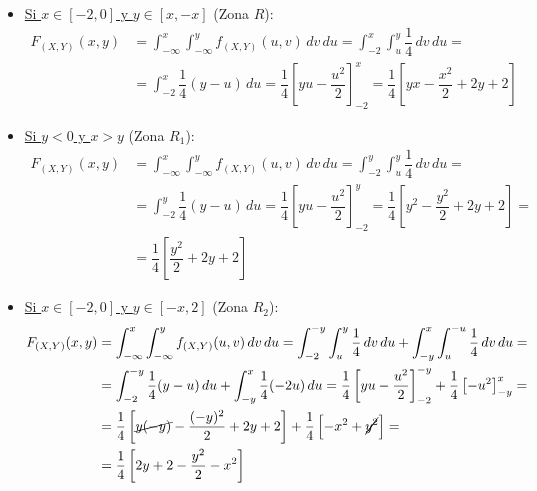 \documentclass[12pt]{article}
\begin{document}
\begin{ejercicio}
\begin{enumerate}
\begin{itemize}
                \item \ul{Si $x\in [-2, 0]$ y $y\in [x, -x]$} (Zona $R$):
                \begin{align*}
                    F_{(X,Y)}(x, y) &= \int_{-\infty}^x \int_{-\infty}^y f_{(X,Y)}(u, v) \, dv \, du = \int_{-2}^x \int_{u}^{y} \dfrac{1}{4} \, dv \, du
                    =\\&= \int_{-2}^x \dfrac{1}{4}(y-u) \, du = \dfrac{1}{4}\left[yu - \dfrac{u^2}{2}\right]_{-2}^x = \dfrac{1}{4}\left[yx - \dfrac{x^2}{2} + 2y+2\right]
                \end{align*}

                \item \ul{Si $y<0$ y $x > y$} (Zona $R_1$):
                \begin{align*}
                    F_{(X,Y)}(x, y) &= \int_{-\infty}^x \int_{-\infty}^y f_{(X,Y)}(u, v) \, dv \, du = \int_{-2}^y \int_{u}^{y} \dfrac{1}{4} \, dv \, du
                    =\\&= \int_{-2}^y \dfrac{1}{4}(y-u) \, du = \dfrac{1}{4}\left[yu - \dfrac{u^2}{2}\right]_{-2}^y = \dfrac{1}{4}\left[y^2 - \dfrac{y^2}{2} + 2y+2\right]
                    =\\&= \dfrac{1}{4}\left[\dfrac{y^2}{2} + 2y + 2\right]
                \end{align*}

                \item \ul{Si $x\in [-2, 0]$ y $y\in [-x, 2]$} (Zona $R_2$):
                \begin{align*}
                    F_{(X,Y)}(x, y) &= \int_{-\infty}^x \int_{-\infty}^y f_{(X,Y)}(u, v) \, dv \, du = \int_{-2}^{-y} \int_{u}^{y} \dfrac{1}{4} \, dv \, du+ \int_{-y}^{x} \int_{u}^{-u} \dfrac{1}{4} \, dv \, du
                    =\\&= \int_{-2}^{-y} \dfrac{1}{4}(y-u) \, du + \int_{-y}^{x} \dfrac{1}{4}(-2u) \, du = \dfrac{1}{4}\left[yu - \dfrac{u^2}{2}\right]_{-2}^{-y} + \dfrac{1}{4}\left[-u^2\right]_{-y}^{x}
                    =\\&= \dfrac{1}{4}\left[\cancel{y(-y)} - \dfrac{(-y)^2}{2} + 2y+2\right] + \dfrac{1}{4}\left[-x^2 + \cancel{y^2}\right]
                    =\\&= \dfrac{1}{4}\left[2y + 2 - \dfrac{y^2}{2} - x^2\right]
                \end{align*}


\end{itemize}
\end{enumerate}
\end{ejercicio}
\end{document}
